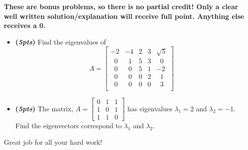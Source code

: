 \documentclass[12pt]{article}%
\begin{document}
\noindent \textbf{These are bonus problems, so there is no partial credit! Only a clear well written solution/explanation will receive full point. Anything else receives a 0.}
\begin{itemize}
    \item \textbf{(\emph{5pts})} Find the eigenvalues of 
    \[A = \begin{bmatrix} -2 &    -4 & 2 & 3 & \sqrt5 \\
                       \;\;0 & \;\;1 & 5 & 3 & \;\;0  \\
                       \;\;0 & \;\;0 & 5 & 1 & -2     \\
                       \;\;0 & \;\;0 & 0 & 2 & \;\;1  \\
                       \;\;0 & \;\;0 & 0 & 0 & \;\;3  \\
          \end{bmatrix}
    \]
    \vspace{5cm}
    \item \textbf{(\emph{5pts})} The matrix, \( A = \begin{bmatrix} 0&1&1 \\ 1&0&1 \\ 1&1& 0 \end{bmatrix}\) has eigenvalues \(\lambda_1=2\) and  \(\lambda_{2}=-1\).
    \\
    \noindent Find the eigenvectors correspond to \(\lambda_1\) and \(\lambda_{2}\).
\end{itemize}
\vfill
\begin{center}
    Great job for all your hard work!
\end{center}
\end{document}
